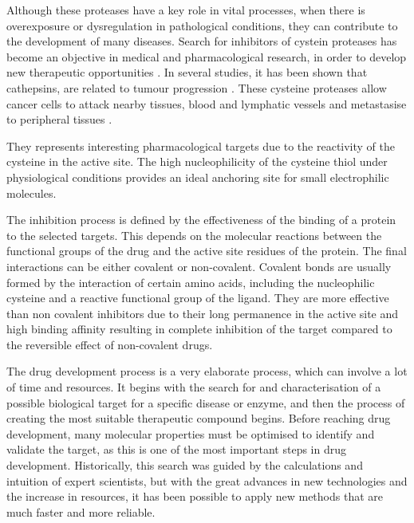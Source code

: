 \documentclass[final,times,twocolumn,article]{elsarticle}
\begin{document}
Although these proteases have a key role in vital processes, when there is overexposure or dysregulation in pathological conditions, they can contribute to the development of many diseases. Search for inhibitors of cystein proteases has become an objective in medical and pharmacological research, in order to develop new therapeutic opportunities \cite{cath}. In several studies, it has been shown that cathepsins, are related to tumour progression \cite{Berdowska2004} \cite{Mohamed2006}. These cysteine proteases allow cancer cells to attack nearby tissues, blood and lymphatic vessels and metastasise to peripheral tissues \cite{Gupta2020} \cite{Gocheva2006}.

 They represents interesting pharmacological targets due to the reactivity of the cysteine in the active site. The high nucleophilicity of the cysteine thiol under physiological conditions provides an ideal anchoring site for small electrophilic molecules. \cite{Maurais2019} 

The inhibition process is defined by the effectiveness of the binding of a protein to the selected targets. This depends on the molecular reactions between the functional groups of the drug and the active site residues of the protein. The final interactions can be either covalent or non-covalent. 
Covalent bonds are usually formed by the interaction of certain amino acids, including the nucleophilic cysteine and a reactive functional group of the ligand. They are more effective than non covalent inhibitors due to their long permanence in the active site and high binding affinity resulting in complete inhibition of the target compared to the reversible effect of non-covalent drugs. \cite{Aljoundi2020} 


The drug development process is a very elaborate process, which can involve a lot of time and resources. It begins with the search for and characterisation of a possible biological target for a specific disease or enzyme, and then the process of creating the most suitable therapeutic compound begins. Before reaching drug development, many molecular properties must be optimised to identify and validate the target, as this is one of the most important steps in drug development. \cite{Hughes2011}
Historically, this search was guided by the calculations and intuition of expert scientists, but with the great advances in new technologies and the increase in resources, it has been possible to apply new methods that are much faster and more reliable. \cite{Hop2018}
\end{document}
